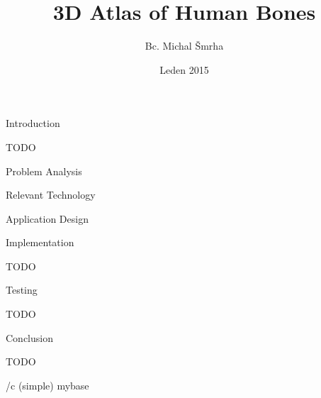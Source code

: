 

\worktype [M/EN]
\title {3D Atlas of Human Bones}
\author {Bc. Michal Šmrha}
\date {Leden 2015}
\makefront

\chap Introduction

TODO

\chap Problem Analysis



\chap Relevant Technology



\chap Application Design



\chap Implementation

TODO

\chap Testing

TODO

\chap Conclusion

TODO

\bibchap
\usebib/c (simple) mybase

\bye